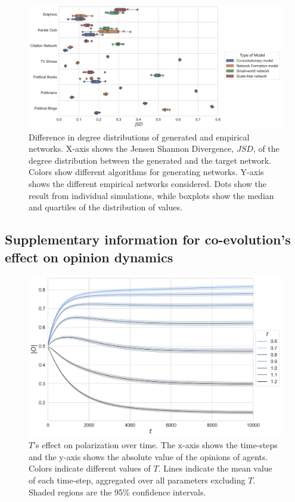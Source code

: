 \documentclass[11pt]{article}
\begin{document}
\begin{figure}[H]
    \centering
    \includegraphics[width=.9\linewidth]{../plots/overall/Model_Evaluation_JSD.png}
  \caption{Difference in degree distributions of generated and empirical networks. X-axis shows the Jensen Shannon Divergence, $JSD$, of the degree distribution between the generated and the target network. Colors show different algorithms for generating networks. Y-axis shows the different empirical networks considered. Dots show the result from individual simulations, while boxplots show the median and quartiles of the distribution of values.}
  \label{appendix:eval_divergence}
\end{figure}

\subsection{Supplementary information for co-evolution's effect on opinion dynamics}

\begin{figure}[H]
    \centering
    \includegraphics[width=.7\linewidth]{../plots/overall/Absolute_Opinion_Threshold.png}
  \caption{$T$'s effect on polarization over time. The x-axis shows the time-steps and the y-axis shows the absolute value of the opinions of agents. Colors indicate different values of $T$. Lines indicate the mean value of each time-step, aggregated over all parameters excluding $T$. Shaded regions are the 95\% confidence intervals.}
  \label{appendix:threshold}
\end{figure}
\end{document}
